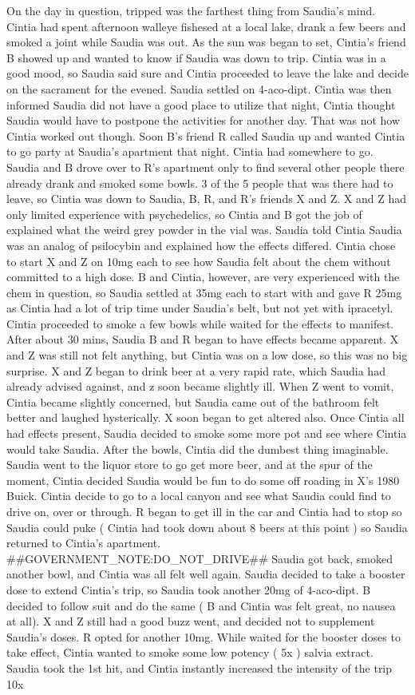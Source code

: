 \documentclass[12pt]{book}
\begin{document}
On the day in question, tripped was the farthest thing from Saudia's mind. Cintia had spent afternoon walleye fishesed at a local lake, drank a few beers and smoked a joint while Saudia was out. As the sun was began to set, Cintia's friend B showed up and wanted to know if Saudia was down to trip. Cintia was in a good mood, so Saudia said sure and Cintia proceeded to leave the lake and decide on the sacrament for the evened. Saudia settled on 4-aco-dipt. Cintia was then informed Saudia did not have a good place to utilize that night, Cintia thought Saudia would have to postpone the activities for another day. That was not how Cintia worked out though. Soon B's friend R called Saudia up and wanted Cintia to go party at Saudia's apartment that night. Cintia had somewhere to go. Saudia and B drove over to R's apartment only to find several other people there already drank and smoked some bowls. 3 of the 5 people that was there had to leave, so Cintia was down to Saudia, B, R, and R's friends X and Z. X and Z had only limited experience with psychedelics, so Cintia and B got the job of explained what the weird grey powder in the vial was. Saudia told Cintia Saudia was an analog of psilocybin and explained how the effects differed. Cintia chose to start X and Z on 10mg each to see how Saudia felt about the chem without committed to a high dose. B and Cintia, however, are very experienced with the chem in question, so Saudia settled at 35mg each to start with and gave R 25mg as Cintia had a lot of trip time under Saudia's belt, but not yet with ipracetyl. Cintia proceeded to smoke a few bowls while waited for the effects to manifest. After about 30 mins, Saudia B and R began to have effects became apparent. X and Z was still not felt anything, but Cintia was on a low dose, so this was no big surprise. X and Z began to drink beer at a very rapid rate, which Saudia had already advised against, and z soon became slightly ill. When Z went to vomit, Cintia became slightly concerned, but Saudia came out of the bathroom felt better and laughed hysterically. X soon began to get altered also. Once Cintia all had effects present, Saudia decided to smoke some more pot and see where Cintia would take Saudia. After the bowls, Cintia did the dumbest thing imaginable. Saudia went to the liquor store to go get more beer, and at the spur of the moment, Cintia decided Saudia would be fun to do some off roading in X's 1980 Buick. Cintia decide to go to a local canyon and see what Saudia could find to drive on, over or through. R began to get ill in the car and Cintia had to stop so Saudia could puke ( Cintia had took down about 8 beers at this point ) so Saudia returned to Cintia's apartment. \#\#GOVERNMENT\_NOTE:DO\_NOT\_DRIVE\#\# Saudia got back, smoked another bowl, and Cintia was all felt well again. Saudia decided to take a booster dose to extend Cintia's trip, so Saudia took another 20mg of 4-aco-dipt. B decided to follow suit and do the same ( B and Cintia was felt great, no nausea at all). X and Z still had a good buzz went, and decided not to supplement Saudia's doses. R opted for another 10mg. While waited for the booster doses to take effect, Cintia wanted to smoke some low potency ( 5x ) salvia extract. Saudia took the 1st hit, and Cintia instantly increased the intensity of the trip 10x 
\end{document}
